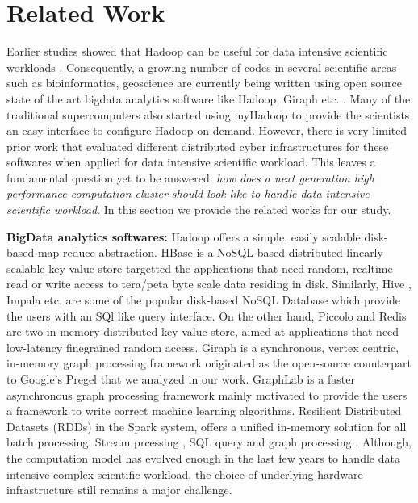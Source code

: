 \documentclass[conference]{IEEEtran}
\begin{document}
\section {Related Work} \label{Related Work}
Earlier studies showed that Hadoop can be useful for data intensive scientific workloads \cite{schadoop:fadika}.
Consequently, a growing number of codes in several scientific areas such as bioinformatics, geoscience are currently being written using open source state of the art bigdata analytics software like Hadoop, Giraph etc. \cite{fw:myhadoop}.
Many of the traditional supercomputers also started using myHadoop \cite{fw:myhadoop} to provide the scientists an easy interface to configure Hadoop on-demand. 
However, there is very limited prior work that evaluated different distributed cyber infrastructures for these softwares when applied for data intensive scientific workload.
This leaves a fundamental question yet to be answered: \textit{how does a next generation  high performance computation cluster should look like to handle data intensive scientific workload}.
In this section we provide the related works for our study.

\textbf{BigData analytics softwares:}
Hadoop \cite{fw:hadoop} offers a simple, easily scalable disk-based map-reduce abstraction.
HBase \cite{fw:hbase} is a NoSQL-based distributed linearly scalable key-value store targetted the applications that need random, realtime read or write access to tera/peta byte scale data residing in disk.
Similarly, Hive \cite{fw:hive}, Impala \cite{fw:impala} etc. are some of the popular disk-based NoSQL Database which provide the users with an SQl like query interface.
On the other hand, Piccolo \cite{fw:piccolo} and Redis \cite{fw:redis} are two in-memory distributed key-value store, aimed at applications that need low-latency finegrained random access. 
Giraph \cite{fw:giraph} is a synchronous, vertex centric, in-memory graph processing framework originated as the open-source counterpart to Google's Pregel \cite{fw:pregel} that we analyzed in our work.
GraphLab \cite{fw:graphlab} is a faster asynchronous graph processing framework mainly motivated to provide the users a framework to write correct machine learning algorithms.
Resilient Distributed Datasets (RDDs) \cite{fw:rdd} in the Spark system, offers a unified in-memory solution for all batch processing, Stream prcessing \cite{fw:sparkstreaming}, SQL query \cite{fw:sparksql} and graph processing \cite{fw:graphx}.
Although, the computation model has evolved enough in the last few years to handle data intensive complex scientific workload, the choice of underlying hardware infrastructure still remains a major challenge.
\end{document}
